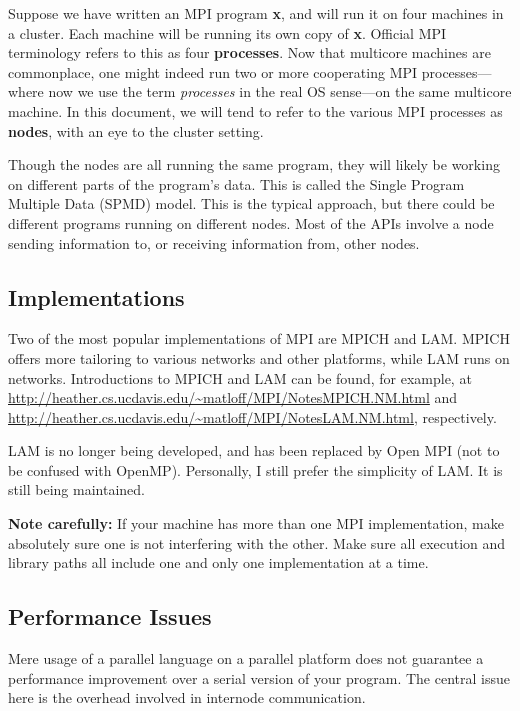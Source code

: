 Suppose we have written an MPI program {\bf x}, and will run it on four
machines in a cluster.  Each machine will be running its own copy of
{\bf x}.  Official MPI terminology refers to this as four {\bf
processes}.  Now that multicore machines are commonplace, one might
indeed run two or more cooperating MPI processes---where now we use the
term {\it processes} in the real OS sense---on the same multicore
machine.  In this document, we will tend to refer to the various MPI
processes as {\bf nodes}, with an eye to the cluster setting.

Though the nodes are all running the same program, they will likely be
working on different parts of the program's data.  This is called the
Single Program Multiple Data (SPMD) model.  This is the typical
approach, but there could be different programs running on different
nodes.  Most of the APIs involve a node sending information to, or
receiving information from, other nodes.

\subsection{Implementations}

Two of the most popular implementations of MPI are MPICH and LAM.  MPICH
offers more tailoring to various networks and other platforms, while LAM
runs on networks.  Introductions to MPICH and LAM can be found, for
example, at
\url{http://heather.cs.ucdavis.edu/~matloff/MPI/NotesMPICH.NM.html} and
\url{http://heather.cs.ucdavis.edu/~matloff/MPI/NotesLAM.NM.html},
respectively. 

LAM is no longer being developed, and has been replaced by Open MPI (not
to be confused with OpenMP).  Personally, I still prefer the simplicity
of LAM.  It is still being maintained.

{\bf Note carefully:}  If your machine has more than one MPI
implementation, make absolutely sure one is not interfering with the
other.  Make sure all execution and library paths all include one and
only one implementation at a time.

\subsection{Performance Issues} 

Mere usage of a parallel language on a parallel platform does not
guarantee a performance improvement over a serial version of your
program.  The central issue here is the overhead involved in internode
communication.


